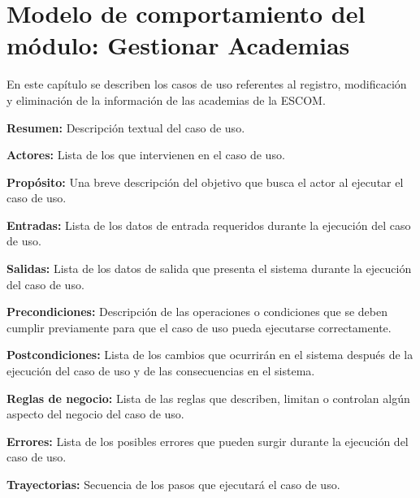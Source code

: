 \newpage

\section{Modelo de comportamiento del módulo: Gestionar Academias \label{chp:gestionarAcademias}}
En este capítulo se describen los casos de uso referentes al registro, modificación y eliminación de la información de las academias de la ESCOM. \bigskip

     \begin{objetivos}
	\item {\bf Resumen:} Descripción textual del caso de uso.
	\item {\bf Actores:} Lista de los 
	 que intervienen en el caso de uso.
	\item {\bf Propósito:} Una breve descripción del objetivo que busca el actor al ejecutar el caso de uso.
	\item {\bf Entradas:} Lista de los datos de entrada requeridos durante la ejecución del caso de uso.
	\item {\bf Salidas:} Lista de los datos de salida que presenta el sistema durante la ejecución del caso de uso.
	\item {\bf Precondiciones:} Descripción de las operaciones o condiciones que se deben cumplir previamente para que el caso de uso pueda ejecutarse correctamente.
	\item {\bf Postcondiciones:} Lista de los cambios que ocurrirán en el sistema después de la ejecución del caso de uso y de las consecuencias en el sistema.
	\item {\bf Reglas de negocio:} Lista de las reglas que describen, limitan o controlan algún aspecto del negocio del caso de uso.
	\item {\bf Errores:} Lista de los posibles errores que pueden surgir durante la ejecución del caso de uso.
	\item {\bf Trayectorias:} Secuencia de los pasos que ejecutará el caso de uso.
    \end{objetivos}

	
	
